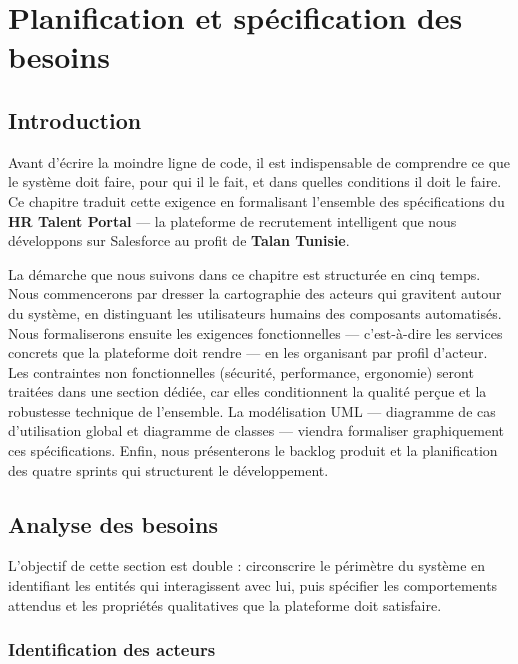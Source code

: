 \chapter{Planification et spécification des besoins}
\label{chap:planification}

\section{Introduction}

Avant d'écrire la moindre ligne de code, il est indispensable de comprendre ce que le système doit faire, pour qui il le fait, et dans quelles conditions il doit le faire. Ce chapitre traduit cette exigence en formalisant l'ensemble des spécifications du \textbf{HR Talent Portal} --- la plateforme de recrutement intelligent que nous développons sur Salesforce au profit de \textbf{Talan Tunisie}.

\medskip

La démarche que nous suivons dans ce chapitre est structurée en cinq temps. Nous commencerons par dresser la cartographie des acteurs qui gravitent autour du système, en distinguant les utilisateurs humains des composants automatisés. Nous formaliserons ensuite les exigences fonctionnelles --- c'est-à-dire les services concrets que la plateforme doit rendre --- en les organisant par profil d'acteur. Les contraintes non fonctionnelles (sécurité, performance, ergonomie) seront traitées dans une section dédiée, car elles conditionnent la qualité perçue et la robustesse technique de l'ensemble. La modélisation UML --- diagramme de cas d'utilisation global et diagramme de classes --- viendra formaliser graphiquement ces spécifications. Enfin, nous présenterons le backlog produit et la planification des quatre sprints qui structurent le développement.

\section{Analyse des besoins}

L'objectif de cette section est double : circonscrire le périmètre du système en identifiant les entités qui interagissent avec lui, puis spécifier les comportements attendus et les propriétés qualitatives que la plateforme doit satisfaire.

\subsection{Identification des acteurs}

